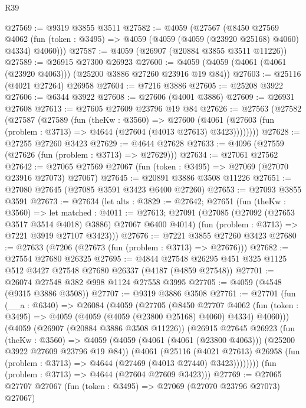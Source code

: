 \begin{lexlean}{R39}
\begin{coremodule}
@27569 := @9319 @3855 @3511
@27582 := @4059
    (@27567
      (@8450
        @27569
        @4062
        (fun (token : @3495) => @4059 (@4059 (@4059 (@23920 @25168) @4060) @4334) @4060)))
@27587 := @4059 (@26907 (@20884 @3855 @3511 @11226))
@27589 := @26915 @27300 @26923
@27600 := @4059 (@4059 (@4061 (@4061 (@23920 @4063))) (@25200 @3886 @27260 @23916 @19 @84))
@27603 := @25116 (@4021 @27264) @26958
@27604 := @7216 @3886
@27605 := @25208 @3922
@27606 := @6344 @3922
@27608 := @27606 (@4001 @3886)
@27609 := @26931 @27608
@27613 := @27605 @27609 @23796 @19 @84
@27626 := @27563
    (@27582
      (@27587
        (@27589
          (fun (theKw : @3560) =>
          @27600 (@4061 (@27603 (fun (problem : @3713) => @4644 (@27604 (@4013 @27613) @3423))))))))
@27628 := @27255 @27260 @3423
@27629 := @4644 @27628
@27633 := @4096 (@27559 (@27626 (fun (problem : @3713) => @27629)))
@27634 := @27061 @27562
@27642 := @27065 @27569 @27067 (fun (token : @3495) => @27069 (@27070 @23916 @27073) @27067)
@27645 := @20891 @3886 @3508 @11226
@27651 := @27080 @27645 (@27085 @3591 @3423 @6400 @27260)
@27653 := @27093 @3855 @3591
@27673 := @27634
    (let alts : @3829 := @27642;
    @27651
      (fun (theKw : @3560) =>
      let matched : @4011 := @27613;
      @27091
        (@27085 (@27092 (@27653 @3517 @3514 @4018) @3886) @27067 @6400 @4014)
        (fun (problem : @3713) => @7221 @3919 @27107 @3423)))
@27676 := @7221 @3855 @27260 @3423
@27680 := @27633 (@7206 (@27673 (fun (problem : @3713) => @27676)))
@27682 := @27554 @27680 @26325
@27695 := @4844 @27548 @26295 @451 @325 @1125 @512 @3427 @27548 @27680 @26337 (@4187 (@4859 @27548))
@27701 := @26074 @27548 @382 @998 @1124 @27558 @3995
@27705 := @4059 (@4548 (@9315 @3886 @3508))
@27707 := @9319 @3886 @3508
@27761 := @27701
    (fun (__a : @6340) =>
    @26084
      (@4059
        (@27705
          (@8450
            @27707
            @4062
            (fun (token : @3495) => @4059 (@4059 (@4059 (@23800 @25168) @4060) @4334) @4060)))
        (@4059
          (@26907 (@20884 @3886 @3508 @11226))
          (@26915
            @27645
            @26923
            (fun (theKw : @3560) =>
            @4059
              (@4059 (@4061 (@4061 (@23800 @4063))) (@25200 @3922 @27609 @23796 @19 @84))
              (@4061
                (@25116
                  (@4021 @27613)
                  @26958
                  (fun (problem : @3713) => @4644 (@27469 (@4013 @27440) @3423))))))))
      (fun (problem : @3713) => @4644 (@27604 @27609 @3423)))
@27769 := @27065 @27707 @27067 (fun (token : @3495) => @27069 (@27070 @23796 @27073) @27067)

\end{coremodule}
\end{lexlean}

